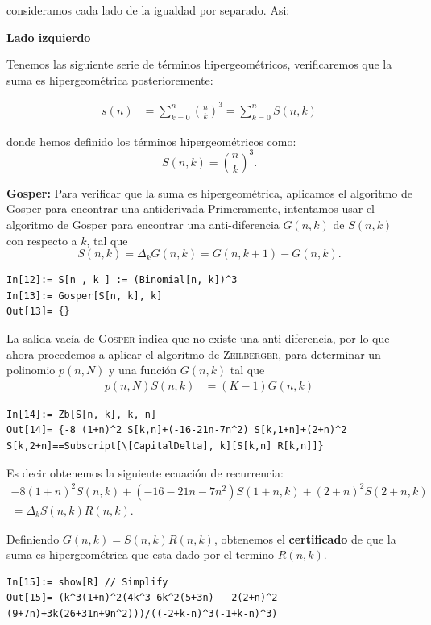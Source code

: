 \begin{solucion}
 consideramos cada lado de la igualdad por separado. Asi:

\textbf{Lado izquierdo}

Tenemos las siguiente serie de términos hipergeométricos, verificaremos que la suma es hipergeométrica posterioremente:

\begin{align*}
  s(n) &= \sum_{k=0}^{n} \binom{n}{k}^{3} = \sum_{k=0}^{n} S(n,k)
\end{align*}

donde hemos definido los términos hipergeométricos como:
\[
  S(n,k) = \binom{n}{k}^{3}.
\]

\textbf{Gosper:} Para verificar que la suma es hipergeométrica, aplicamos el algoritmo de Gosper para encontrar una antiderivada
Primeramente, intentamos usar el algoritmo de Gosper para encontrar una anti-diferencia $G(n,k)$ de $S(n,k)$ con respecto a $k$, tal que
\[
  S(n,k) = \Delta_k G(n,k) = G(n,k+1) - G(n,k).
\]
\begin{lstlisting}[caption={Definición de \texttt{F} y aplicación de Gosper}]
In[12]:= S[n_, k_] := (Binomial[n, k])^3
In[13]:= Gosper[S[n, k], k]
Out[13]= {}
\end{lstlisting}
La salida vacía de \textsc{Gosper} indica que no existe una anti-diferencia, por lo que ahora procedemos a aplicar el algoritmo de \textsc{Zeilberger}, para determinar un polinomio $p(n,N)$ y una función $G(n,k)$ tal que
\begin{align}
    p(n,N)S(n,k) &= (K-1)G(n,k)
\end{align}

\begin{lstlisting}[caption={Recurrencia obtenida vía \textsc{Zeilberger}}]
In[14]:= Zb[S[n, k], k, n]
Out[14]= {-8 (1+n)^2 S[k,n]+(-16-21n-7n^2) S[k,1+n]+(2+n)^2 S[k,2+n]==Subscript[\[CapitalDelta], k][S[k,n] R[k,n]]}
\end{lstlisting}

Es decir obtenemos la siguiente ecuación de recurrencia:
\begin{align*}
  -8 (1+n)^2 S(n,k)+ (-16-21n-7n^2) S(1+n,k) + (2+n)^2 S(2+n,k)\\ = \Delta_k S(n,k) R(n,k).
\end{align*}

Definiendo $G(n,k) = S(n,k) R(n,k)$, obtenemos el \textbf{certificado} de que la suma es hipergeométrica que esta dado por el termino $R(n,k)$.
\begin{lstlisting}[caption={Verificación de la hipergeometría}]
In[15]:= show[R] // Simplify
Out[15]= (k^3(1+n)^2(4k^3-6k^2(5+3n) - 2(2+n)^2 (9+7n)+3k(26+31n+9n^2)))/((-2+k-n)^3(-1+k-n)^3)
\end{lstlisting}


\end{solucion}
